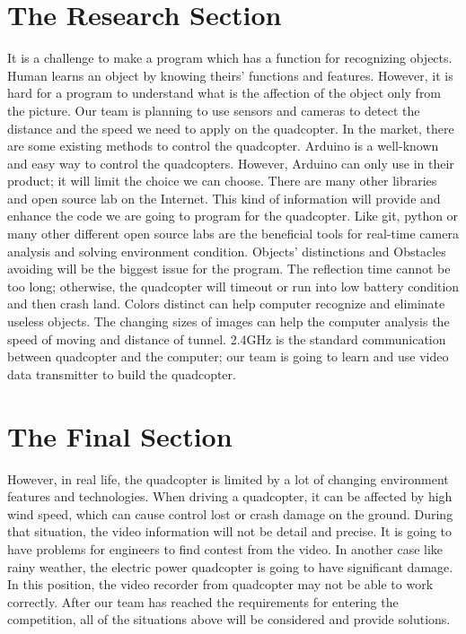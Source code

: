 \documentclass[onecolumn, draftclsnofoot,10pt, compsoc]{IEEEtran}
\begin{document}
\section{The Research Section}
It is a challenge to make a program which has a function for recognizing objects. Human learns an object by knowing theirs' functions and features. However, it is hard for a program to understand what is the affection of the object only from the picture. Our team is planning to use sensors and cameras to detect the distance and the speed we need to apply on the quadcopter. In the market, there are some existing methods to control the quadcopter. Arduino is a well-known and easy way to control the quadcopters. However, Arduino can only use in their product; it will limit the choice we can choose. There are many other libraries and open source lab on the Internet. This kind of information will provide and enhance the code we are going to program for the quadcopter. Like git, python or many other different open source labs are the beneficial tools for real-time camera analysis and solving environment condition. Objects' distinctions and Obstacles avoiding will be the biggest issue for the program. The reflection time cannot be too long; otherwise, the quadcopter will timeout or run into low battery condition and then crash land. Colors distinct can help computer recognize and eliminate useless objects. The changing sizes of images can help the computer analysis the speed of moving and distance of tunnel. 2.4GHz is the standard communication between quadcopter and the computer; our team is going to learn and use video data transmitter to build the quadcopter. 
\section{The Final Section}
However, in real life, the quadcopter is limited by a lot of changing environment features and technologies. When driving a quadcopter, it can be affected by high wind speed, which can cause control lost or crash damage on the ground. During that situation, the video information will not be detail and precise. It is going to have problems for engineers to find contest from the video. In another case like rainy weather, the electric power quadcopter is going to have significant damage. In this position, the video recorder from quadcopter may not be able to work correctly.  
After our team has reached the requirements for entering the competition, all of the situations above will be considered and provide solutions. 
\end{document}
